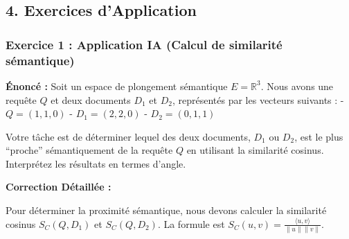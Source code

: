 \documentclass[11pt,a4paper]{report}
\begin{document}
\hypertarget{exercices-dapplication}{%
\subsection{4. Exercices d'Application}\label{exercices-dapplication}}

\hypertarget{exercice-1-application-ia-calcul-de-similarituxe9-suxe9mantique}{%
\subsubsection{Exercice 1 : Application IA (Calcul de similarité
sémantique)}\label{exercice-1-application-ia-calcul-de-similarituxe9-suxe9mantique}}

\textbf{Énoncé :} Soit un espace de plongement sémantique
\(E = \mathbb{R}^3\). Nous avons une requête \(Q\) et deux documents
\(D_1\) et \(D_2\), représentés par les vecteurs suivants : -
\(Q = (1, 1, 0)\) - \(D_1 = (2, 2, 0)\) - \(D_2 = (0, 1, 1)\)

Votre tâche est de déterminer lequel des deux documents, \(D_1\) ou
\(D_2\), est le plus ``proche'' sémantiquement de la requête \(Q\) en
utilisant la similarité cosinus. Interprétez les résultats en termes
d'angle.

\textbf{Correction Détaillée :}

Pour déterminer la proximité sémantique, nous devons calculer la
similarité cosinus \(S_C(Q, D_1)\) et \(S_C(Q, D_2)\). La formule est
\(S_C(u, v) = \frac{\langle u, v \rangle}{\|u\| \|v\|}\).
\end{document}

